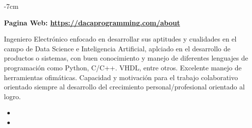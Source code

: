 \documentclass[10pt,a4paper]{altacv}
\begin{document}



\begin{adjustwidth}{}{-7cm}
\makecvheader
\end{adjustwidth}


\textbf{Pagina Web: \href{https://dacaprogramming.com/about}{https://dacaprogramming.com/about}}

Ingeniero Electrónico enfocado en desarrollar sus aptitudes y cualidades en el campo de Data Science e Inteligencia Artificial, aplciado en el desarrollo de productos o sistemas, con buen conocimiento y manejo de diferentes lenguajes de programación como Python, C/C++. VHDL, entre otros. Excelente manejo de herramientas ofimáticas. Capacidad y motivación para el trabajo colaborativo orientado siempre al desarrollo del crecimiento personal/profesional orientado al logro.\\

\begin{itemize}
\item {}

\item {}
\end{itemize}
\end{document}
